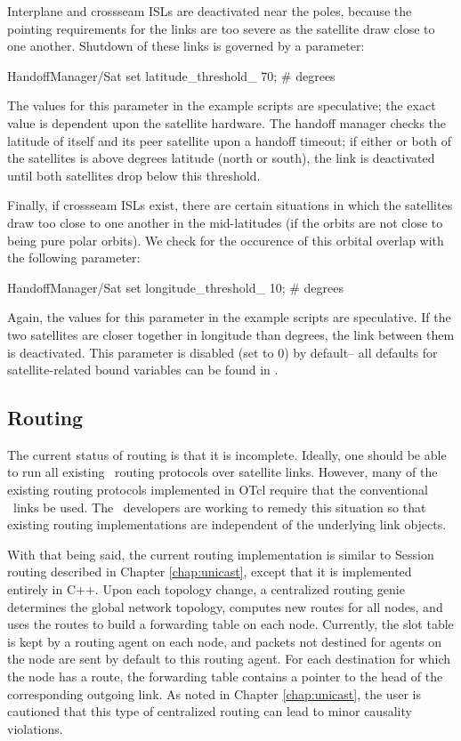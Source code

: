 Interplane and crossseam ISLs are deactivated near the poles, because 
the pointing requirements for the links are too severe as the satellite
draw close to one another.  Shutdown of these links is governed by a parameter:
\begin{program}
HandoffManager/Sat set latitude_threshold_ 70; # degrees 
\end{program}
The values for this parameter in the example scripts are speculative;
the exact value is dependent upon the satellite hardware.  The handoff
manager checks the latitude of itself and its peer satellite upon a handoff
timeout; if either or both of the satellites is above 
 degrees latitude (north or south), the link
is deactivated until both satellites drop below this threshold.

Finally, if crossseam ISLs exist, there are certain situations in which
the satellites draw too close to one another in the mid-latitudes (if
the orbits are not close to being pure polar orbits).  We check for
the occurence of this orbital overlap with the following parameter:
\begin{program}
HandoffManager/Sat set longitude_threshold_ 10; # degrees 
\end{program}
Again, the values for this parameter in the example scripts are speculative.
If the two satellites are closer together in longitude than 
 degrees, the link between them is deactivated.
This parameter is disabled (set to $0$) by default-- all defaults for
satellite-related bound variables can be found in .



\subsection{Routing }
\label{sec:satellite/usage/routing}

The current status of routing is that it is incomplete.  Ideally, one should
be able to run all existing \ns~routing protocols over satellite links.  
However,
many of the existing routing protocols implemented in OTcl require that
the conventional \ns~links be used.  The \ns~developers are working to
remedy this situation so that existing routing implementations are 
independent of the underlying link objects.

With that being said, the current routing implementation is similar to
Session routing described in Chapter \ref{chap:unicast}, except that it
is implemented entirely in C++.   Upon each topology change, a centralized
routing genie determines the global network topology, computes new routes
for all nodes, and uses the routes to build
a forwarding table on each node.  Currently,
the slot table is kept by a routing agent on each node, and packets 
not destined for agents on the node are sent by default to this routing 
agent.  For each destination for which the node has a route, the forwarding
table contains a pointer to the head of the corresponding outgoing link.
As noted in Chapter \ref{chap:unicast}, the user is cautioned that this type 
of centralized routing can lead to minor causality violations.


